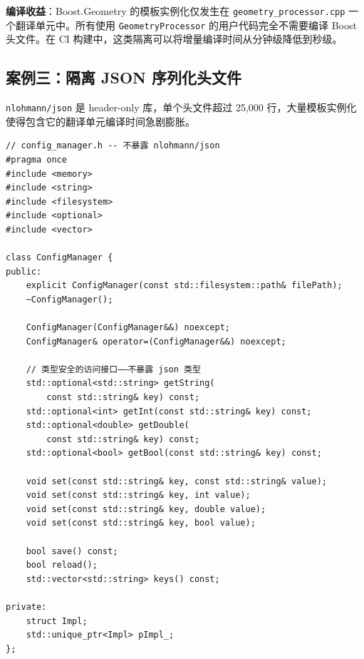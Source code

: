 \documentclass[12pt,a4paper,fontset=fandol]{ctexbook}
\begin{document}
\textbf{编译收益}：Boost.Geometry 的模板实例化仅发生在 \texttt{geometry\_processor.cpp} 一个翻译单元中。所有使用 \texttt{GeometryProcessor} 的用户代码完全不需要编译 Boost 头文件。在 CI 构建中，这类隔离可以将增量编译时间从分钟级降低到秒级。

\subsection{案例三：隔离 JSON 序列化头文件}

\texttt{nlohmann/json} 是 header-only 库，单个头文件超过 25,000 行，大量模板实例化使得包含它的翻译单元编译时间急剧膨胀。

\begin{lstlisting}[caption={配置管理器——PImpl 隔离 JSON 库}]
// config_manager.h -- 不暴露 nlohmann/json
#pragma once
#include <memory>
#include <string>
#include <filesystem>
#include <optional>
#include <vector>

class ConfigManager {
public:
    explicit ConfigManager(const std::filesystem::path& filePath);
    ~ConfigManager();

    ConfigManager(ConfigManager&&) noexcept;
    ConfigManager& operator=(ConfigManager&&) noexcept;

    // 类型安全的访问接口——不暴露 json 类型
    std::optional<std::string> getString(
        const std::string& key) const;
    std::optional<int> getInt(const std::string& key) const;
    std::optional<double> getDouble(
        const std::string& key) const;
    std::optional<bool> getBool(const std::string& key) const;

    void set(const std::string& key, const std::string& value);
    void set(const std::string& key, int value);
    void set(const std::string& key, double value);
    void set(const std::string& key, bool value);

    bool save() const;
    bool reload();
    std::vector<std::string> keys() const;

private:
    struct Impl;
    std::unique_ptr<Impl> pImpl_;
};
\end{lstlisting}
\end{document}
